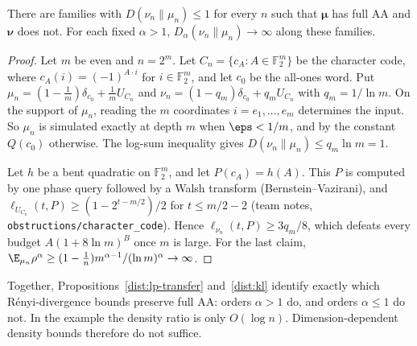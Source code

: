\begin{proposition}\label{dist:kl}
There are families with \(D(\nu_n\|\mu_n)\le1\) for every \(n\) such that
\(\boldsymbol\mu\) has full AA and \(\boldsymbol\nu\) does not. For each fixed
\(\alpha>1\), \(D_\alpha(\nu_n\|\mu_n)\to\infty\) along these families.
\end{proposition}
\begin{proof}
Let \(m\) be even and \(n=2^m\). Let
\(C_n=\{c_A:A\in\mathbb F_2^m\}\) be the character code, where
\(c_A(i)=(-1)^{A\cdot i}\) for \(i\in\mathbb F_2^m\), and let \(c_0\) be the
all-ones word. Put
\(\mu_n=(1-\tfrac1m)\delta_{c_0}+\tfrac1mU_{C_n}\) and
\(\nu_n=(1-q_m)\delta_{c_0}+q_mU_{C_n}\) with \(q_m=1/\ln m\). On the support of
\(\mu_n\), reading the \(m\) coordinates \(i=e_1,\dots,e_m\) determines the input.
So \(\mu_n\) is simulated exactly at depth \(m\) when \(\eps<1/m\), and by the
constant \(Q(c_0)\) otherwise. The log-sum inequality gives
\(D(\nu_n\|\mu_n)\le q_m\ln m=1\).

Let \(h\) be a bent quadratic on \(\mathbb F_2^m\), and let \(P(c_A)=h(A)\). This
\(P\) is computed by one phase query followed by a Walsh transform
(Bernstein--Vazirani), and \(\ell_{U_{C_n}}(t,P)\ge(1-2^{t-m/2})/2\) for
\(t\le m/2-2\) (team notes, \texttt{obstructions/character\_code}). Hence
\(\ell_{\nu_n}(t,P)\ge3q_m/8\), which defeats every budget
\(A(1+8\ln m)^B\) once \(m\) is large. For the last claim,
\(\E_{\mu_n}\rho^\alpha\ge(1-\tfrac1n)m^{\alpha-1}/(\ln m)^\alpha\to\infty\).
\end{proof}
Together, Propositions~\ref{dist:lp-transfer} and~\ref{dist:kl} identify
exactly which Rényi-divergence bounds preserve full AA: orders \(\alpha>1\) do,
and orders \(\alpha\le1\) do not. In the example the density ratio is only
\(O(\log n)\). Dimension-dependent density bounds therefore do not suffice.

